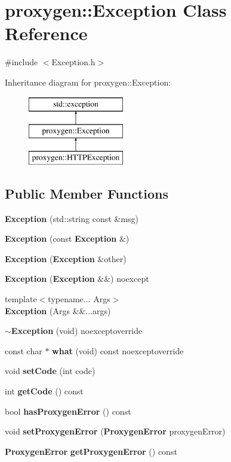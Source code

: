 \section{proxygen\+:\+:Exception Class Reference}
\label{classproxygen_1_1Exception}


{\ttfamily \#include $<$Exception.\+h$>$}

Inheritance diagram for proxygen\+:\+:Exception\+:\begin{figure}[H]
\begin{center}
\leavevmode
\includegraphics[height=3.000000cm]{classproxygen_1_1Exception}
\end{center}
\end{figure}
\subsection*{Public Member Functions}
\begin{DoxyCompactItemize}
\item 
{\bf Exception} (std\+::string const \&msg)
\item 
{\bf Exception} (const {\bf Exception} \&)
\item 
{\bf Exception} ({\bf Exception} \&other)
\item 
{\bf Exception} ({\bf Exception} \&\&) noexcept
\item 
{\footnotesize template$<$typename... Args$>$ }\\{\bf Exception} (Args \&\&...args)
\item 
{\bf $\sim$\+Exception} (void) noexceptoverride
\item 
const char $\ast$ {\bf what} (void) const noexceptoverride
\item 
void {\bf set\+Code} (int code)
\item 
int {\bf get\+Code} () const 
\item 
bool {\bf has\+Proxygen\+Error} () const 
\item 
void {\bf set\+Proxygen\+Error} ({\bf Proxygen\+Error} proxygen\+Error)
\item 
{\bf Proxygen\+Error} {\bf get\+Proxygen\+Error} () const 
\end{DoxyCompactItemize}
